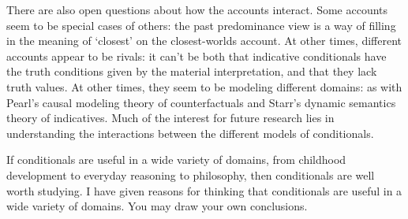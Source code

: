 There are also open questions about how the accounts interact.  Some accounts seem to be special cases of others: the past predominance view is a way of filling in the meaning of `closest' on the closest-worlds account.  At other times, different accounts appear to be rivals: it can't be both that indicative conditionals have the truth conditions given by the material interpretation, and that they lack truth values.  At other times, they seem to be modeling different domains: as with Pearl's causal modeling theory of counterfactuals and Starr's dynamic semantics theory of indicatives.  Much of the interest for future research lies in understanding the interactions between the different models of conditionals.

If conditionals are useful in a wide variety of domains, from childhood development to everyday reasoning to philosophy, then conditionals are well worth studying.  I have given reasons for thinking that conditionals are useful in a wide variety of domains.  You may draw your own conclusions.